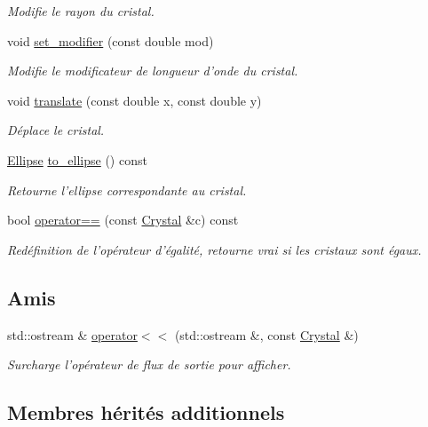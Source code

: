 \begin{DoxyCompactItemize}
\begin{DoxyCompactList}\small\item\em Modifie le rayon du cristal. \end{DoxyCompactList}\item 
void \hyperlink{classCrystal_a9aaadd11a8fc70932b998073f67df8fe}{set\+\_\+modifier} (const double mod)
\begin{DoxyCompactList}\small\item\em Modifie le modificateur de longueur d’onde du cristal. \end{DoxyCompactList}\item 
void \hyperlink{classCrystal_a1369f8ba73c1fbbc4df22cda83d9fe7c}{translate} (const double x, const double y)
\begin{DoxyCompactList}\small\item\em Déplace le cristal. \end{DoxyCompactList}\item 
\hyperlink{classEllipse}{Ellipse} \hyperlink{classCrystal_a57617a62778965048bcea6b22e9d6f48}{to\+\_\+ellipse} () const 
\begin{DoxyCompactList}\small\item\em Retourne l'ellipse correspondante au cristal. \end{DoxyCompactList}\item 
bool \hyperlink{classCrystal_a882bf87d3b3c0dd2c4fbecbbb9d1c066}{operator==} (const \hyperlink{classCrystal}{Crystal} \&c) const 
\begin{DoxyCompactList}\small\item\em Redéfinition de l'opérateur d'égalité, retourne vrai si les cristaux sont égaux. \end{DoxyCompactList}\end{DoxyCompactItemize}
\subsection*{Amis}
\begin{DoxyCompactItemize}
\item 
std\+::ostream \& \hyperlink{classCrystal_a45da91e3993e90a57a5f4fd5edda0adb}{operator$<$$<$} (std\+::ostream \&, const \hyperlink{classCrystal}{Crystal} \&)
\begin{DoxyCompactList}\small\item\em Surcharge l'opérateur de flux de sortie pour afficher. \end{DoxyCompactList}\end{DoxyCompactItemize}
\subsection*{Membres hérités additionnels}


